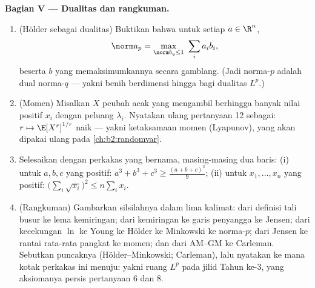 \begin{problem}
\medskip
\noindent\textbf{Bagian V --- Dualitas dan rangkuman.}
\begin{enumerate}[resume]
  \item (Hölder sebagai dualitas) Buktikan bahwa untuk setiap $a \in
        \R^n$,
        \[
        \norm a_p = \max_{\norm b_q \leq 1}\ \sum_i a_ib_i ,
        \]
        beserta $b$ yang memaksimumkannya secara gamblang. (Jadi
        norma-$p$ adalah dual norma-$q$ --- yakni benih berdimensi
        hingga bagi dualitas $L^p$.)
  \item (Momen) Misalkan $X$ peubah acak yang mengambil berhingga
        banyak nilai positif $x_i$ dengan peluang
        $\lambda_i$. Nyatakan ulang pertanyaan 12 sebagai: $r \mapsto
        \E[X^r]^{1/r}$ naik --- yakni ketaksamaan momen
        (Lyapunov), yang akan dipakai ulang pada
        \cref{ch:b2:randomvar}.
  \item Selesaikan dengan perkakas yang bernama, masing-masing dua
        baris: (i) untuk $a, b, c$ yang positif: $a^3 + b^3 + c^3 \geq
        \frac{(a+b+c)^3}{9}$; (ii) untuk $x_1, \dots, x_n$ yang positif:
        $\bigl(\sum_i\sqrt{x_i}\bigr)^2 \leq n\sum_i x_i$.
  \item (Rangkuman) Gambarkan silsilahnya dalam lima kalimat: dari
        definisi tali busur ke lema kemiringan; dari kemiringan ke
        garis penyangga ke Jensen; dari kecekungan $\ln$ ke Young ke
        Hölder ke Minkowski ke norma-$p$; dari Jensen ke rantai
        rata-rata pangkat ke momen; dan dari AM--GM ke Carleman.
        Sebutkan puncaknya (Hölder--Minkowski; Carleman), lalu
        nyatakan ke mana kotak perkakas ini menuju: yakni ruang $L^p$
        pada jilid Tahun ke-3, yang aksiomanya persis pertanyaan 6 dan 8.

\end{enumerate}
\end{problem}

